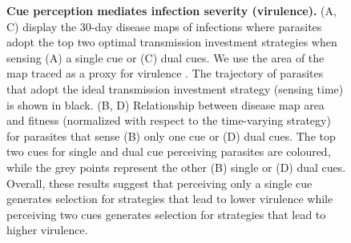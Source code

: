 \documentclass[10pt,letterpaper]{article}
\begin{document}
\begin{figure}[!h]
\caption{{\bf Cue perception mediates infection severity (virulence).}
(A, C) display the 30-day disease maps of infections where parasites adopt the top two optimal transmission investment strategies when sensing (A) a single cue or (C) dual cues. We use the area of the map traced as a proxy for virulence \cite{torres_tracking_2016}. The trajectory of parasites that adopt the ideal transmission investment strategy (sensing time) is shown in black. (B, D) Relationship between disease map area and fitness (normalized with respect to the time-varying strategy) for parasites that sense (B) only one cue or (D) dual cues. The top two cues for single and dual cue perceiving parasites are coloured, while the grey points represent the other (B) single or (D) dual cues. Overall, these results suggest that perceiving only a single cue generates selection for strategies that lead to lower virulence while perceiving two cues generates selection for strategies that lead to higher virulence.}
\label{fig7}
\end{figure}
\end{document}

